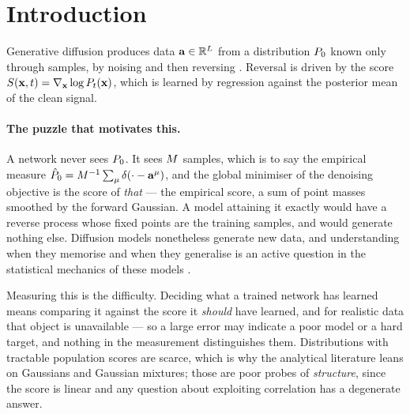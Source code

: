 \documentclass{article}
\begin{document}
\begin{abstract}
Against networks trained by denoising score matching on identical data, with the optimisation
budget of \emph{both} arms selected on a held-out bundle, the structured estimator attains between
\ratioloword{} and \ratiohisubword{} times lower pointwise denoising error across \nsizessub{}
training-set sizes, and the network at the largest budget does not reach what the estimator attains
at the smallest. The comparison is
deliberately asymmetric in prior information: the estimator is handed the Markov factorisation,
the autoregressive form and a low-dimensional innovation family, and the networks are handed none
of them. What it measures is therefore the worth of that structure on this family, not a general
ranking of the two approaches.
\end{abstract}

\section{Introduction}
\label{sec:intro}

Generative diffusion produces data $\mathbf{a}\in\mathbb{R}^{L}$ from a distribution $P_0$ known only
through samples, by noising and then reversing \citep{sohl2015,ho2020,song2021}. Reversal is
driven by the score $S(\mathbf{x},t)=\nabla_{\mathbf{x}}\log P_t(\mathbf{x})$, which is learned by regression
against the posterior mean of the clean signal.

\paragraph{The puzzle that motivates this.} A network never sees $P_0$. It sees $M$ samples,
which is to say the empirical measure $\hat P_0 = M^{-1}\sum_\mu \delta(\cdot - \mathbf{a}^\mu)$, and
the global minimiser of the denoising objective is the score of \emph{that} --- the empirical
score, a sum of point masses smoothed by the forward Gaussian. A model attaining it exactly would
have a reverse process whose fixed points are the training samples, and would generate nothing
else. Diffusion models nonetheless generate new data, and understanding when they memorise and
when they generalise is an active question in the statistical mechanics of these models
\citep{biroli2023,biroli2024dynamical}.

Measuring this is the difficulty. Deciding what a trained network has learned means comparing it
against the score it \emph{should} have learned, and for realistic data that object is
unavailable --- so a large error may indicate a poor model or a hard target, and nothing in the
measurement distinguishes them. Distributions with tractable population scores are scarce, which
is why the analytical literature leans on Gaussians and Gaussian mixtures; those are poor probes
of \emph{structure}, since the score is linear and any question about exploiting correlation has a
degenerate answer.
\end{document}
